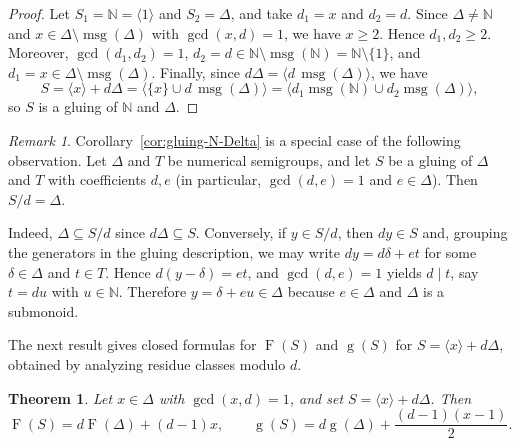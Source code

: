 \documentclass[12pt,a4paper]{amsart}
\newtheorem{theorem}{Theorem}[section]
\theoremstyle{definition}
\theoremstyle{remark}
\newtheorem*{remark}{Remark}
\begin{document}
\begin{proof}
Let $S_1=\mathbb{N}=\langle 1\rangle$ and $S_2=\Delta$, and take $d_1=x$ and $d_2=d$.
Since $\Delta\ne\mathbb N$ and $x\in\Delta\setminus\operatorname{msg}(\Delta)$ with
$\gcd(x,d)=1$, we have $x\ge2$. Hence $d_1,d_2\ge2$. Moreover,
$\gcd(d_1,d_2)=1$, $d_2=d\in \mathbb{N}\setminus\operatorname{msg}(\mathbb{N})
=\mathbb{N}\setminus\{1\}$, and $d_1=x\in\Delta\setminus\operatorname{msg}(\Delta)$.
Finally, since $d\Delta=\langle d\,\operatorname{msg}(\Delta)\rangle$, we have
\[
S=\langle x\rangle+d\Delta
=\langle \{x\}\cup d\,\operatorname{msg}(\Delta)\rangle
=\langle d_1\operatorname{msg}(\mathbb{N})\cup d_2\operatorname{msg}(\Delta)\rangle,
\]
so $S$ is a gluing of $\mathbb{N}$ and $\Delta$.
\end{proof}

\begin{remark}\label{rem:gluing-quotient}
Corollary~\ref{cor:gluing-N-Delta} is a special case of the following observation.
Let $\Delta$ and $T$ be numerical semigroups, and let $S$ be a gluing of $\Delta$ and $T$ with coefficients $d,e$
(in particular, $\gcd(d,e)=1$ and $e\in\Delta$). Then $S/d=\Delta$.

Indeed, $\Delta\subseteq S/d$ since $d\Delta\subseteq S$. Conversely, if $y\in S/d$, then $dy\in S$ and, grouping the generators
in the gluing description, we may write $dy=d\delta+et$ for some $\delta\in\Delta$ and $t\in T$. Hence $d(y-\delta)=et$, and $\gcd(d,e)=1$ yields $d\mid t$, say $t=du$ with $u\in\mathbb{N}$. Therefore $y=\delta+eu\in\Delta$ because $e\in\Delta$ and $\Delta$ is a submonoid.
\end{remark}

The next result gives closed formulas for $\operatorname{F}(S)$ and $\operatorname{g}(S)$ for $S=\langle x\rangle+d\Delta$, obtained by analyzing residue classes modulo $d$.

\begin{theorem}\label{th:Fg-rankone}
Let $x\in \Delta$ with $\gcd(x,d)=1$, and set $S=\langle x\rangle+d\Delta$. Then
\[
\operatorname{F}(S)=d\operatorname{F}(\Delta)+(d-1)x,
\qquad
\operatorname{g}(S)=d\operatorname{g}(\Delta)+\frac{(d-1)(x-1)}{2}.
\]
\end{theorem}
\end{document}

